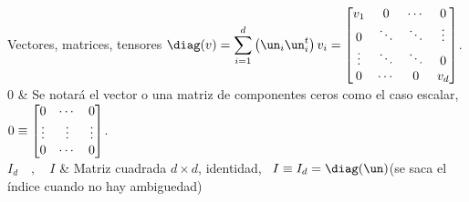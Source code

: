 \begin{notation}{Vectores, matrices, tensores}
$\displaystyle \diag(v) = \sum_{i=1}^d \left( \un_i \un_i^t \right) v_i =
\protect\begin{bmatrix}
  v_1  &   0    & \cdots &    0   \\
   0   & \ddots & \ddots & \vdots \\
\vdots & \ddots & \ddots &    0   \\
   0   & \cdots &    0   &   v_d
\end{bmatrix}\protect$.\vspace{1mm}\\[2.5mm]
%
\hline
%
$0$ & Se notar\'a el vector o una matriz de componentes ceros como el caso
escalar,\vspace{1mm}\newline
$0 \equiv \protect\begin{bmatrix}
   0   & \cdots &    0   \\
\vdots & \vdots & \vdots \\
   0   & \cdots &    0
\protect\end{bmatrix}$.\vspace{1mm}\\[2.5mm]
\hline
%
$I_d \quad , \quad I$ & Matriz cuadrada $d \times d$, identidad, \ $I \equiv I_d
= \diag(\un)$\vspace{1mm}\newline (se saca el \'indice cuando no hay ambiguedad)\\[2.5mm]
\hline
%

\end{notation}
